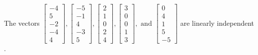 \begin{exercise}
\begin{exerciseStatement}
  \end{exerciseStatement}
  \begin{exerciseAnswer}
   The vectors \(\left[\begin{array}{r}
-4 \\
5 \\
-2 \\
-4 \\
4
\end{array}\right] , \left[\begin{array}{r}
-5 \\
-1 \\
4 \\
-3 \\
5
\end{array}\right] , \left[\begin{array}{r}
2 \\
1 \\
0 \\
2 \\
4
\end{array}\right] , \left[\begin{array}{r}
3 \\
0 \\
0 \\
1 \\
3
\end{array}\right] , \text{ and } \left[\begin{array}{r}
0 \\
4 \\
1 \\
5 \\
-5
\end{array}\right]\) are 
  	 linearly independent  .
  


  \end{exerciseAnswer}
\end{exercise}